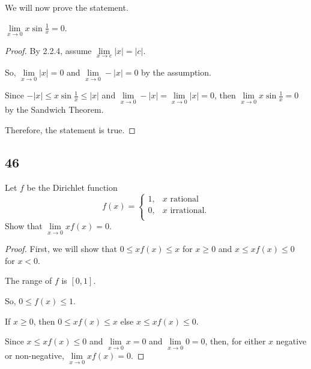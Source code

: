 \documentclass[../m134a-hw2.tex]{subfiles}
\begin{document}
We will now prove the statement.

\begin{proposition}
    $\lim\limits_{x \to 0} x\sin{\frac{1}{x}} = 0$.
\end{proposition}

\begin{proof}
    By 2.2.4, assume $\lim\limits_{x \to c} |x| = |c|$.

    So, $\lim\limits_{x \to 0} |x| = 0$ and $\lim\limits_{x \to 0} -|x| = 0$ by the assumption.

    Since $-|x| \leq x\sin{\frac{1}{x}} \leq |x|$ and $\lim\limits_{x \to 0} -|x| = \lim\limits_{x \to 0} |x| = 0$, then $\lim\limits_{x \to 0} x\sin{\frac{1}{x}} = 0$ by the Sandwich Theorem.

    Therefore, the statement is true.
\end{proof}

\subsection*{46}
Let $f$ be the Dirichlet function \[f(x) = \begin{cases}
    1, & x \text{ rational} \\
    0, & x \text{ irrational.} \\
\end{cases}\]
Show that $\lim\limits_{x \to 0} xf(x) = 0$.

\begin{proof}
    First, we will show that $0 \leq xf(x) \leq x$ for $x \geq 0$ and $x \leq xf(x) \leq 0$ for $x < 0$.

    The range of $f$ is $[0,1]$.

    So, $0 \leq f(x) \leq 1$.

    If $x \geq 0$, then $0 \leq xf(x) \leq x$ else $x \leq xf(x) \leq 0$.

    Since $x \leq xf(x) \leq 0$ and $\lim\limits_{x \to 0} x = 0$ and $\lim\limits_{x \to 0} 0 = 0$, then, for either $x$ negative or non-negative, $\lim\limits_{x \to 0} xf(x) = 0$.
\end{proof}
\end{document}
